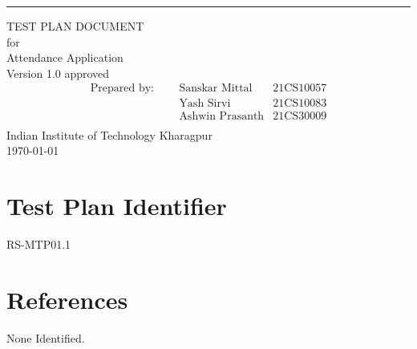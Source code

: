 \documentclass{scrreprt}
\date{}
\def\myversion{1.0 }
\begin{document}
\begin{flushright}
    \rule{16cm}{5pt}\vskip1cm
    \begin{bfseries}
        \Huge{TEST PLAN DOCUMENT}\\
        \vspace{1cm}
        for\\
        \vspace{1cm}
        Attendance Application\\
        \vspace{1cm}
        \LARGE{Version \myversion approved}\\
        \vspace{0cm}
        \begin{align*}
        \text{Prepared by: } \;\;\;\; 
         &\text{Sanskar Mittal} &\text{21CS10057}\\
         &\text{Yash Sirvi} &\text{21CS10083}\\
         &\text{Ashwin Prasanth} &\text{21CS30009}\\
        \end{align*}
        \vspace{1.9cm}
        Indian Institute of Technology Kharagpur\\
        \vspace{1.9cm}
        \today\\
    \end{bfseries}
\end{flushright}

\tableofcontents

\pagebreak

\chapter{Test Plan Identifier}
RS-MTP01.1

\chapter{References}
None Identified.
\end{document}
